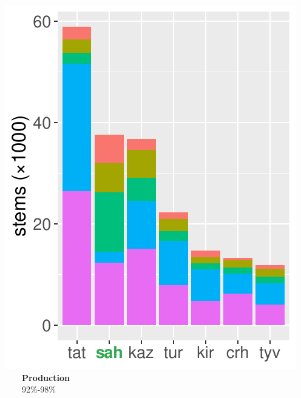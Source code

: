 \documentclass[a0paper,fleqn]{betterposter}
\begin{document}
{%
\begin{minipage}{0.317\textwidth}
    \centering
    \includegraphics[width=\textwidth]{img/lgs1}\vspace{-0.8em}\\
    {\color{lightgreen}~~~~\textbf{Production}}\\
    ~~~~92\%-98\%
\end{minipage}
\begin{minipage}{0.356\textwidth}
    \centering

\end{minipage}}
\end{document}
